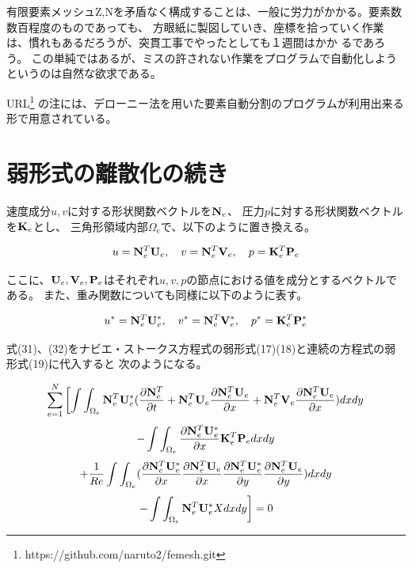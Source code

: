 \documentclass{jarticle}
\begin{document}
有限要素メッシュZ,Nを矛盾なく構成することは、一般に労力がかかる。要素数数百程度のものであっても、
方眼紙に製図していき、座標を拾っていく作業は、慣れもあるだろうが、突貫工事でやったとしても１週間はかか
るであろう。
この単純ではあるが、ミスの許されない作業をプログラムで自動化しようというのは自然な欲求である。

URL\footnote{https://github.com/naruto2/femesh.git}
の注には、デローニー法を用いた要素自動分割のプログラムが利用出来る形で用意されている。


\section{弱形式の離散化の続き}

速度成分$u,v$に対する形状関数ベクトルを${\bf N}_e$、
圧力$p$に対する形状関数ベクトルを${\bf K}_e$とし、
三角形領域内部$\Omega_e$で、以下のように置き換える。

\begin{equation}
u = {\bf N}_e^T{\bf U}_e, ~~~ v = {\bf N}_e^T{\bf V}_e, ~~~ p = {\bf K}_e^T{\bf P}_e
\end{equation}


ここに、${\bf U}_e,{\bf V}_e,{\bf P}_e$はそれぞれ$u,v,p$の節点における値を成分とするベクトルである。
また、重み関数についても同様に以下のように表す。

\begin{equation}
u^* = {\bf N}_e^T{\bf U}_e^*, ~~~ v^* = {\bf N}_e^T{\bf V}_e^*, ~~~ p^* = {\bf K}_e^T{\bf P}_e^*
\end{equation}



式(31)、(32)をナビエ・ストークス方程式の弱形式(17)(18)と連続の方程式の弱形式(19)に代入すると
次のようになる。

\[
\sum_{e=1}^N\left[ \int\int_{\Omega_e}{\bf N}_e^T{\bf U}_e^*(\frac{\partial{\bf N}_e^T}{\partial t}
  + {\bf N}_e^T{\bf U}_e\frac{\partial {\bf N}_e^T{\bf U}_e}{\partial x}
  + {\bf N}_e^T{\bf V}_e\frac{\partial {\bf N}_e^T{\bf U}_e}{\partial x})dxdy
\right.\]\[
- \int\int_{\Omega_e}\frac{\partial {\bf N}_e^T{\bf U}_e^*}{\partial x}{\bf K}_e^T {\bf P}_e dxdy
\]\[
+\frac{1}{Re}\int\int_{\Omega_e}(
\frac{\partial {\bf N}_e^T{\bf U}_e^*}{\partial x}\frac{\partial {\bf N}_e^T{\bf U}_e}{\partial x}
\frac{\partial {\bf N}_e^T{\bf U}_e^*}{\partial y}\frac{\partial {\bf N}_e^T{\bf U}_e}{\partial y}
)dxdy
\]\begin{equation}
\left.-\int\int_{\Omega_e}{\bf N}_e^T{\bf U}_e^* X dxdy \right] = 0
\end{equation}
\end{document}

